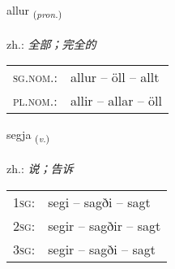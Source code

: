 \documentclass[frontgrid, backgrid]{flacards}\usepackage[]{graphicx}\usepackage[]{xcolor}
\begin{document}
\renewcommand{\blhead}{\vskip5pt {\small\bfseries\footnotesize Fornafn | 代词 }}
\renewcommand{\bcfoot}{\vskip5pt \hspace{2pt}{\small\bfseries\footnotesize 1K}}


{allur \small{\textsubscript{(\textit{pron.})}} \\[1ex] %
\textphonetic{[atlʏr]} \\
zh.: \emph{全部；完全的} \\  [2ex]
\renewcommand*{\arraystretch}{0.8}
\begin{tabular}{ll}
\textsc{sg.nom.}: & allur  --  öll -- allt \\ 
\textsc{pl.nom.}: & allir -- allar -- öll
\end{tabular}
}

\renewcommand{\flhead}{\vskip5pt \fboxsep=0pt {\small\bfseries\footnotesize Sagnorð | 动词}}
\renewcommand{\fcfoot}{\vskip5pt \fboxsep=0pt \hspace{2pt}{\small\bfseries\footnotesize 1K}}

\renewcommand{\blhead}{\vskip5pt {\small\bfseries\footnotesize Sagnorð | 动词 }}
\renewcommand{\bcfoot}{\vskip5pt \hspace{2pt}{\small\bfseries\footnotesize 1K}}


{segja \small{\textsubscript{(\textit{v.})}} \\[1ex] %
\textphonetic{[seija]} \\
zh.: \emph{说；告诉} \\  [2ex]
\renewcommand*{\arraystretch}{0.8}
\begin{tabular}{p{1cm}l}
\textsc{1sg}: & segi -- sagði -- sagt \\ 
\textsc{2sg}: & segir -- sagðir -- sagt \\ 
\textsc{3sg}: & segir -- sagði -- sagt \\ 
\end{tabular}
}

\renewcommand{\flhead}{\vskip5pt \fboxsep=0pt {\small\bfseries\footnotesize Fornafn | 代词}}
\renewcommand{\fcfoot}{\vskip5pt \fboxsep=0pt \hspace{2pt}{\small\bfseries\footnotesize 1K}}
\end{document}
